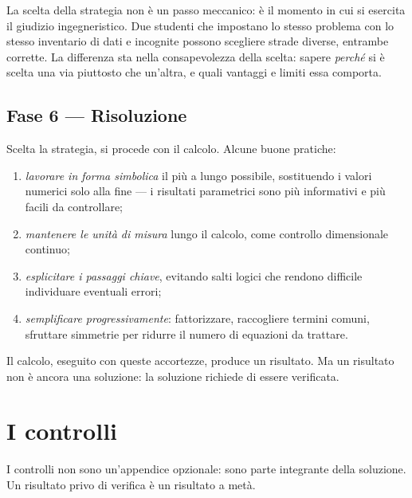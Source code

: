 \begin{oss}
	La scelta della strategia non è un passo meccanico: è il momento in cui si esercita il giudizio ingegneristico. Due studenti che impostano lo stesso problema con lo stesso inventario di dati e incognite possono scegliere strade diverse, entrambe corrette. La differenza sta nella consapevolezza della scelta: sapere \textit{perché} si è scelta una via piuttosto che un'altra, e quali vantaggi e limiti essa comporta.
\end{oss}


\subsection*{Fase 6 --- Risoluzione}

Scelta la strategia, si procede con il calcolo. Alcune buone pratiche:

\begin{enumerate}[label=(\alph*)]
	\item \textit{lavorare in forma simbolica} il più a lungo possibile, sostituendo i valori numerici solo alla fine --- i risultati parametrici sono più informativi e più facili da controllare;
	\item \textit{mantenere le unità di misura} lungo il calcolo, come controllo dimensionale continuo;
	\item \textit{esplicitare i passaggi chiave}, evitando salti logici che rendono difficile individuare eventuali errori;
	\item \textit{semplificare progressivamente}: fattorizzare, raccogliere termini comuni, sfruttare simmetrie per ridurre il numero di equazioni da trattare.
\end{enumerate}

Il calcolo, eseguito con queste accortezze, produce un risultato. Ma un risultato non è ancora una soluzione: la soluzione richiede di essere verificata.


\section*{I controlli}

I controlli non sono un'appendice opzionale: sono parte integrante della soluzione. Un risultato privo di verifica è un risultato a metà.

